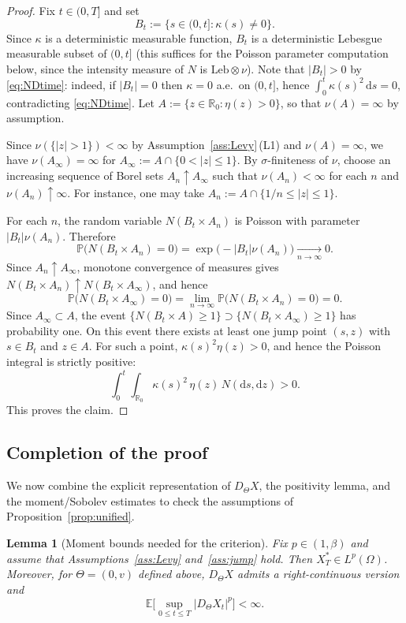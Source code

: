 \documentclass[11pt]{article}
\newcommand{\R}{\mathbb{R}}
\newcommand{\E}{\mathbb{E}}
\newcommand{\Pbb}{\mathbb{P}}
\newcommand{\1}{\mathbf{1}}
\newcommand{\dd}{\mathrm{d}}
\newcommand{\Xstar}{X^{\ast}}
\theoremstyle{plain}
\newtheorem{lemma}[theorem]{Lemma}
\theoremstyle{definition}
\theoremstyle{remark}
\begin{document}
\begin{proof}
Fix $t\in(0,T]$ and set
\[
B_t:=\{s\in(0,t]:\kappa(s)\neq 0\}.
\]
Since $\kappa$ is a deterministic measurable function, $B_t$ is a deterministic Lebesgue measurable subset of $(0,t]$
(this suffices for the Poisson parameter computation below, since the intensity measure of $N$ is $\mathrm{Leb}\otimes\nu$).
Note that $|B_t|>0$ by \eqref{eq:NDtime}: indeed, if $|B_t|=0$ then $\kappa=0$ a.e.\ on $(0,t]$, hence $\int_0^t \kappa(s)^2\,\dd s=0$, contradicting \eqref{eq:NDtime}.
Let $A:=\{z\in\R_0:\eta(z)>0\}$, so that $\nu(A)=\infty$ by assumption.

Since $\nu(\{|z|>1\})<\infty$ by Assumption~\ref{ass:Levy}\,(L1) and $\nu(A)=\infty$, we have
$\nu(A_\infty)=\infty$ for $A_\infty:=A\cap\{0<|z|\le 1\}$.
By $\sigma$-finiteness of $\nu$, choose an increasing sequence of Borel sets $A_n\uparrow A_\infty$
such that $\nu(A_n)<\infty$ for each $n$ and $\nu(A_n)\uparrow\infty$.
For instance, one may take $A_n:=A\cap\{1/n\le |z|\le 1\}$.

For each $n$, the random variable $N(B_t\times A_n)$ is Poisson with parameter $|B_t|\nu(A_n)$.
Therefore
\[
\Pbb\big(N(B_t\times A_n)=0\big)=\exp\big(-|B_t|\nu(A_n)\big)\xrightarrow[n\to\infty]{}0.
\]
Since $A_n\uparrow A_\infty$, monotone convergence of measures gives $N(B_t\times A_n)\uparrow N(B_t\times A_\infty)$,
and hence
\[
\Pbb\big(N(B_t\times A_\infty)=0\big)=\lim_{n\to\infty}\Pbb\big(N(B_t\times A_n)=0\big)=0.
\]
Since $A_\infty\subset A$, the event $\{N(B_t\times A)\ge 1\}\supset\{N(B_t\times A_\infty)\ge 1\}$ has probability one.
On this event there exists at least one jump point $(s,z)$ with $s\in B_t$ and $z\in A$.
For such a point, $\kappa(s)^2\eta(z)>0$, and hence the Poisson integral is strictly positive:
\[
\int_0^t\int_{\R_0} \kappa(s)^2\,\eta(z)\,N(\dd s,\dd z)>0.
\]
This proves the claim.
\end{proof}

\subsection{Completion of the proof}

We now combine the explicit representation of $D_\Theta X$, the positivity lemma, and the moment/Sobolev estimates to check the assumptions of Proposition~\ref{prop:unified}.

\begin{lemma}[Moment bounds needed for the criterion]\label{lem:jump-moment}
Fix $p\in(1,\beta)$ and assume that Assumptions~\ref{ass:Levy} and~\ref{ass:jump} hold.
Then $\Xstar_T\in L^p(\Omega)$.
Moreover, for $\Theta=(0,v)$ defined above, $D_\Theta X$ admits a right-continuous version and
\[
\E\Big[\sup_{0\le t\le T}|D_\Theta X_t|^p\Big]<\infty.
\]
\end{lemma}
\end{document}
